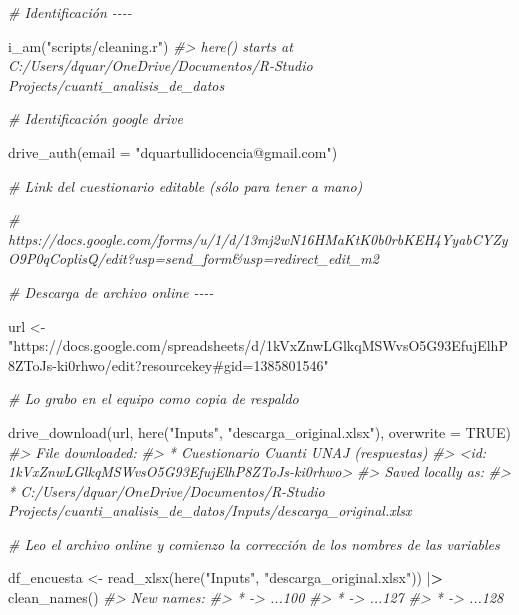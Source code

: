 \documentclass[
]{book}
\newenvironment{Shaded}{\begin{snugshade}}{\end{snugshade}}
\newcommand{\AttributeTok}[1]{\textcolor[rgb]{0.77,0.63,0.00}{#1}}
\newcommand{\CommentTok}[1]{\textcolor[rgb]{0.56,0.35,0.01}{\textit{#1}}}
\newcommand{\ConstantTok}[1]{\textcolor[rgb]{0.00,0.00,0.00}{#1}}
\newcommand{\ErrorTok}[1]{\textcolor[rgb]{0.64,0.00,0.00}{\textbf{#1}}}
\newcommand{\FunctionTok}[1]{\textcolor[rgb]{0.00,0.00,0.00}{#1}}
\newcommand{\NormalTok}[1]{#1}
\newcommand{\OtherTok}[1]{\textcolor[rgb]{0.56,0.35,0.01}{#1}}
\newcommand{\SpecialCharTok}[1]{\textcolor[rgb]{0.00,0.00,0.00}{#1}}
\newcommand{\StringTok}[1]{\textcolor[rgb]{0.31,0.60,0.02}{#1}}
\theoremstyle{definition}
\theoremstyle{definition}
\theoremstyle{definition}
\theoremstyle{definition}
\theoremstyle{remark}
\begin{document}
\begin{Shaded}
\begin{Highlighting}[]
\CommentTok{\# Identificación {-}{-}{-}{-}}

\FunctionTok{i\_am}\NormalTok{(}\StringTok{"scripts/cleaning.r"}\NormalTok{)}
\CommentTok{\#\textgreater{} here() starts at C:/Users/dquar/OneDrive/Documentos/R{-}Studio Projects/cuanti\_analisis\_de\_datos}

\CommentTok{\# Identificación google drive}

\FunctionTok{drive\_auth}\NormalTok{(}\AttributeTok{email =} \StringTok{"dquartullidocencia@gmail.com"}\NormalTok{)}

\CommentTok{\# Link del cuestionario editable (sólo para tener a mano)}

\CommentTok{\# https://docs.google.com/forms/u/1/d/13mj2wN16HMaKtK0b0rbKEH4YyabCYZyO9P0qCoplisQ/edit?usp=send\_form\&usp=redirect\_edit\_m2}

\CommentTok{\# Descarga de archivo online {-}{-}{-}{-}}

\NormalTok{url }\OtherTok{\textless{}{-}} \StringTok{"https://docs.google.com/spreadsheets/d/1kVxZnwLGlkqMSWvsO5G93EfujElhP8ZToJs{-}ki0rhwo/edit?resourcekey\#gid=1385801546"}

\CommentTok{\# Lo grabo en el equipo como copia de respaldo}

\FunctionTok{drive\_download}\NormalTok{(url,}
               \FunctionTok{here}\NormalTok{(}\StringTok{"Inputs"}\NormalTok{, }\StringTok{"descarga\_original.xlsx"}\NormalTok{),}
               \AttributeTok{overwrite =} \ConstantTok{TRUE}\NormalTok{)}
\CommentTok{\#\textgreater{} File downloaded:}
\CommentTok{\#\textgreater{} * \textquotesingle{}Cuestionario Cuanti UNAJ (respuestas)\textquotesingle{}}
\CommentTok{\#\textgreater{}   \textless{}id: 1kVxZnwLGlkqMSWvsO5G93EfujElhP8ZToJs{-}ki0rhwo\textgreater{}}
\CommentTok{\#\textgreater{} Saved locally as:}
\CommentTok{\#\textgreater{} * \textquotesingle{}C:/Users/dquar/OneDrive/Documentos/R{-}Studio Projects/cuanti\_analisis\_de\_datos/Inputs/descarga\_original.xlsx\textquotesingle{}}

\CommentTok{\# Leo el archivo online y comienzo la corrección de los nombres de las variables}
                    
\NormalTok{df\_encuesta }\OtherTok{\textless{}{-}} \FunctionTok{read\_xlsx}\NormalTok{(}\FunctionTok{here}\NormalTok{(}\StringTok{"Inputs"}\NormalTok{, }\StringTok{"descarga\_original.xlsx"}\NormalTok{)) }\SpecialCharTok{|}\ErrorTok{\textgreater{}}
               \FunctionTok{clean\_names}\NormalTok{()}
\CommentTok{\#\textgreater{} New names:}
\CommentTok{\#\textgreater{} * \textasciigrave{}\textasciigrave{} {-}\textgreater{} ...100}
\CommentTok{\#\textgreater{} * \textasciigrave{}\textasciigrave{} {-}\textgreater{} ...127}
\CommentTok{\#\textgreater{} * \textasciigrave{}\textasciigrave{} {-}\textgreater{} ...128}


\end{Highlighting}
\end{Shaded}
\end{document}
